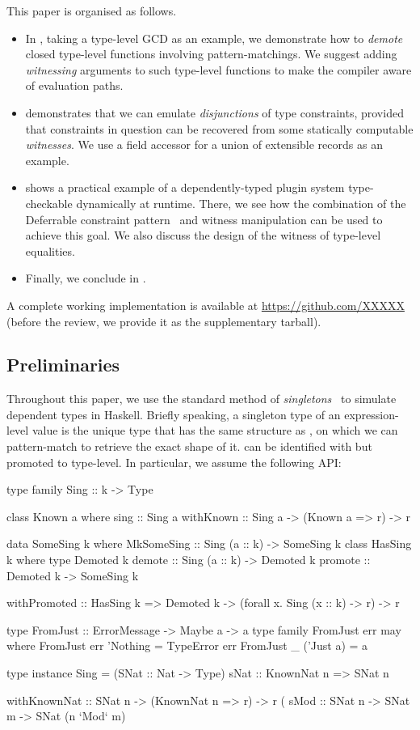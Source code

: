 \documentclass[demotion-paper.tex]{subfiles}
\begin{document}
This paper is organised as follows.
\begin{itemize}
  \item In , taking a type-level GCD as an example, we demonstrate how to \emph{demote} closed type-level functions involving pattern-matchings.
  We suggest adding \emph{witnessing} arguments to such type-level functions to make the compiler aware of evaluation paths.
  \item {} demonstrates that we can emulate \emph{disjunctions} of type constraints, provided that constraints in question can be recovered from some statically computable \emph{witnesses}.
  We use a field accessor for a union of extensible records as an example.
  \item {} shows a practical example of a dependently-typed plugin system type-checkable dynamically at runtime.
  There, we see how the combination of the Deferrable constraint pattern~\cite{Kmett:2020ab} and witness manipulation can be used to achieve this goal.
  We also discuss the design of the witness of type-level equalities.
  \item Finally, we conclude in .
\end{itemize}

A complete working implementation is available at \url{https://github.com/XXXXX} (before the review, we provide it as the supplementary tarball).

\subsection{Preliminaries}
Throughout this paper, we use the standard method of \emph{singletons}~\cite{Eisenberg:2012} to simulate dependent types in Haskell.
Briefly speaking, a singleton type  of an expression-level value  is the unique type that has the same structure as , on which we can pattern-match to retrieve the exact shape of it.  can be identified with  but promoted to type-level.
In particular, we assume the following API:

\begin{code}
type family Sing :: k -> Type

class Known a where
  sing :: Sing a
withKnown :: Sing a -> (Known a => r) -> r

data SomeSing k where
  MkSomeSing :: Sing (a :: k) -> SomeSing k
class HasSing k where
  type Demoted k 
  demote :: Sing (a :: k) -> Demoted k
  promote :: Demoted k -> SomeSing k

withPromoted :: HasSing k
  => Demoted k
  -> (forall x. Sing (x :: k) -> r) -> r

type FromJust :: ErrorMessage -> Maybe a -> a
type family FromJust err may where 
  FromJust err 'Nothing = TypeError err
  FromJust _ ('Just a)  = a

type instance Sing = (SNat :: Nat -> Type)
sNat :: KnownNat n => SNat n

withKnownNat :: SNat n -> (KnownNat n => r) -> r
(%
sMod :: SNat n -> SNat m -> SNat (n `Mod` m)
\end{code}
\end{document}
